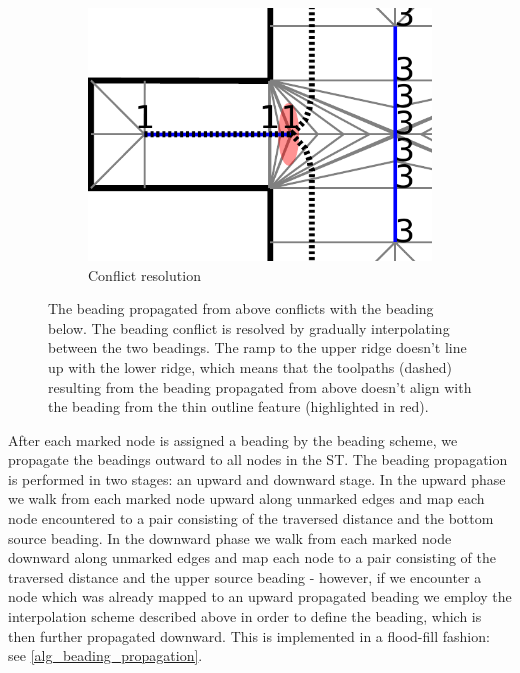 \begin{figure}
\begin{subfigure}{.45\columnwidth}
\includegraphics[height=\figheight]{sources/method/beading_conflict_solved.pdf}
\caption{Conflict resolution}\label{beading_conflict_solved}
\end{subfigure}
\caption{
 The beading propagated from above conflicts with the beading below.
 The beading conflict is resolved by gradually interpolating between the two beadings.
The ramp to the upper ridge doesn't line up with the lower ridge, which means that
the toolpaths (dashed) resulting from the beading propagated from above doesn't align with the beading from the thin outline feature (highlighted in red).
}
\label{beading_conflict_problem}
\end{figure}


\iffalse

After each marked node is assigned a beading by the beading scheme, we propagate the beadings outward to all nodes in the ST.
The beading propagation is performed in two stages: an upward and downward stage.
In the upward phase we walk from each marked node upward along unmarked edges and map each node encountered to a pair consisting of the traversed distance and the bottom source beading.
In the downward phase we walk from each marked node downward along unmarked edges and map each node to a pair consisting of the traversed distance and the upper source beading -
however, if we encounter a node which was already mapped to an upward propagated beading we employ the interpolation scheme described above in order to define the beading, which is then further propagated downward.
This is implemented in a flood-fill fashion: see \cref{alg_beading_propagation}.

